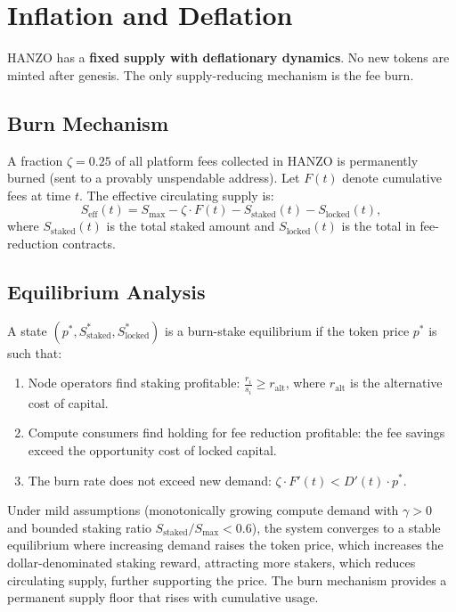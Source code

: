 \section{Inflation and Deflation}

\label{sec:deflation}

HANZO has a \textbf{fixed supply with deflationary dynamics}. No new tokens are
minted after genesis. The only supply-reducing mechanism is the fee burn.

\subsection{Burn Mechanism}

A fraction $\zeta = 0.25$ of all platform fees collected in HANZO is
permanently burned (sent to a provably unspendable address). Let $F(t)$ denote
cumulative fees at time $t$. The effective circulating supply is:
\begin{equation}
S_{\text{eff}}(t) = S_{\max} - \zeta \cdot F(t) - S_{\text{staked}}(t) -
S_{\text{locked}}(t),
\end{equation}
where $S_{\text{staked}}(t)$ is the total staked amount and $S_{\text{locked}}(t)$
is the total in fee-reduction contracts.

\subsection{Equilibrium Analysis}

\begin{definition}
A state $(p^*, S_{\text{staked}}^*, S_{\text{locked}}^*)$ is a burn-stake
equilibrium if the token price $p^*$ is such that:
\begin{enumerate}[leftmargin=1.4em]
    \item Node operators find staking profitable:
    $\frac{r_i}{s_i} \geq r_{\text{alt}}$, where $r_{\text{alt}}$ is the
    alternative cost of capital.
    \item Compute consumers find holding for fee reduction profitable:
    the fee savings exceed the opportunity cost of locked capital.
    \item The burn rate does not exceed new demand: $\zeta \cdot F'(t) <
    D'(t) \cdot p^*$.
\end{enumerate}
\end{definition}

Under mild assumptions (monotonically growing compute demand with $\gamma > 0$
and bounded staking ratio $S_{\text{staked}}/S_{\max} < 0.6$), the system
converges to a stable equilibrium where increasing demand raises the token price,
which increases the dollar-denominated staking reward, attracting more stakers,
which reduces circulating supply, further supporting the price. The burn
mechanism provides a permanent supply floor that rises with cumulative usage.

